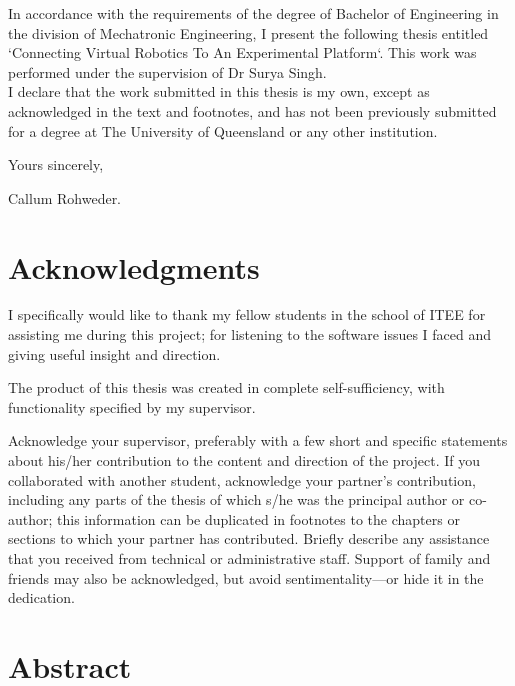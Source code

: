 \documentclass[12pt,openany,a4paper]{book}
\begin{document}
In accordance with the requirements of the degree of Bachelor of
Engineering in the division of 
Mechatronic Engineering,
I present the
following thesis entitled `Connecting Virtual Robotics To An Experimental Platform`.  This work was performed under the supervision of Dr Surya Singh.\\

I declare that the work submitted in this thesis is my own, except as
acknowledged in the text and footnotes, and has not been previously
submitted for a degree at The University of Queensland or any other
institution.

\begin{flushright}
	Yours sincerely,\\
	\medskip

	\medskip
	Callum Rohweder.
\end{flushright}

\cleardoublepage

\chapter{Acknowledgments}

I specifically would like to thank my fellow students in the school of ITEE for assisting me during this project; for listening to the software issues I faced and giving useful insight and direction.

The product of this thesis was created in complete self-sufficiency, with functionality specified by my supervisor.

Acknowledge your supervisor, preferably with a few short and specific
statements about his/her contribution to the content and direction of
the project.  If you collaborated with another student, acknowledge
your partner's contribution, including any parts of the thesis of
which s/he was the principal author or co-author; this information can
be duplicated in footnotes to the chapters or sections to which your
partner has contributed.  Briefly describe any assistance that you
received from technical or administrative staff.  Support of family
and friends may also be acknowledged, but avoid sentimentality---or
hide it in the dedication.

\cleardoublepage

\chapter{Abstract}

\end{document}
